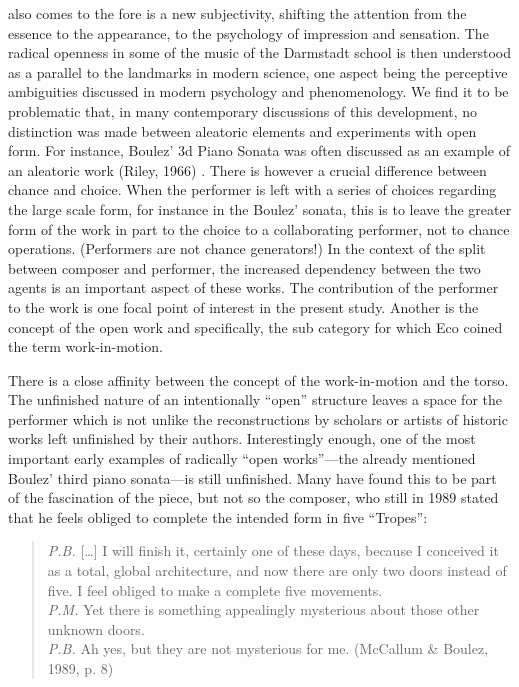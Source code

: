 also comes to the fore is a new subjectivity, shifting the attention
from the essence to the appearance, to the psychology of impression
and sensation. The radical openness in some of the music of the
Darmstadt school is then understood as a parallel to the landmarks in
modern science, one aspect being the perceptive ambiguities discussed
in modern psychology and phenomenology. We find it to be problematic
that, in many contemporary discussions of this development, no
distinction was made between aleatoric elements and experiments with
open form.  For instance, Boulez' 3d Piano Sonata was often discussed
as an example of an aleatoric work (Riley, 1966) . There is however a
crucial difference between chance and choice. When the performer is
left with a series of choices regarding the large scale form, for
instance in the Boulez' sonata, this is to leave the greater form of
the work in part to the choice to a collaborating performer, not to
chance operations. (Performers are not chance generators!) In the
context of the split between composer and performer, the increased
dependency between the two agents is an important aspect of these
works. The contribution of the performer to the work is one focal
point of interest in the present study. Another is the concept of the
open work and specifically, the sub category for which Eco coined the
term work-in-motion.
 
There is a close affinity between the concept of the work-in-motion
and the torso. The unfinished nature of an intentionally ``open''
structure leaves a space for the performer which is not unlike the
reconstructions by scholars or artists of historic works left
unfinished by their authors. Interestingly enough, one of the most
important early examples of radically ``open works''---the already
mentioned Boulez' third piano sonata---is still unfinished. Many have
found this to be part of the fascination of the piece, but not so the
composer, who still in 1989 stated that he feels obliged to complete
the intended form in five ``Tropes'':
 
\begin{quote}
  \emph{P.B.} [\ldots] I will finish it, certainly one of these days, because I
  conceived it as a total, global architecture, and now there are only
  two doors instead of five. I feel obliged to make a complete five
  movements.\\  
  \emph{P.M.} Yet there is something appealingly mysterious about
  those other unknown doors.\\
  \emph{P.B.} Ah yes, but they are not mysterious
  for me. (McCallum \& Boulez, 1989, p. 8)
\end{quote}

